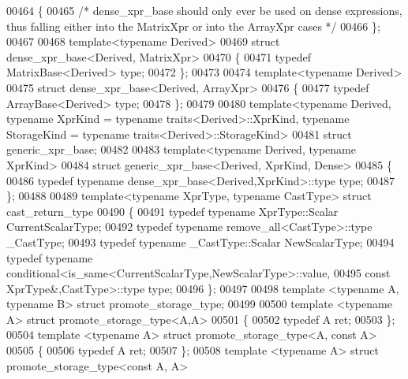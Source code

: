\begin{DoxyCode}
{00464 \{
00465   \textcolor{comment}{/* dense\_xpr\_base should only ever be used on dense expressions, thus falling either into the MatrixXpr
       or into the ArrayXpr cases */}
00466 \};
00467 
00468 \textcolor{keyword}{template}<\textcolor{keyword}{typename} Derived>
00469 \textcolor{keyword}{struct }dense\_xpr\_base<Derived, MatrixXpr>
00470 \{
00471   \textcolor{keyword}{typedef} MatrixBase<Derived> type;
00472 \};
00473 
00474 \textcolor{keyword}{template}<\textcolor{keyword}{typename} Derived>
00475 \textcolor{keyword}{struct }dense\_xpr\_base<Derived, ArrayXpr>
00476 \{
00477   \textcolor{keyword}{typedef} ArrayBase<Derived> type;
00478 \};
00479 
00480 template<typename Derived, typename XprKind = typename traits<Derived>::XprKind, \textcolor{keyword}{typename} StorageKind = \textcolor{keyword}{
      typename} traits<Derived>::StorageKind>
00481 \textcolor{keyword}{struct }generic\_xpr\_base;
00482 
00483 \textcolor{keyword}{template}<\textcolor{keyword}{typename} Derived, \textcolor{keyword}{typename} XprKind>
00484 \textcolor{keyword}{struct }generic\_xpr\_base<Derived, XprKind, Dense>
00485 \{
00486   \textcolor{keyword}{typedef} \textcolor{keyword}{typename} dense\_xpr\_base<Derived,XprKind>::type type;
00487 \};
00488 
00489 \textcolor{keyword}{template}<\textcolor{keyword}{typename} XprType, \textcolor{keyword}{typename} CastType> \textcolor{keyword}{struct }cast\_return\_type
00490 \{
00491   \textcolor{keyword}{typedef} \textcolor{keyword}{typename} XprType::Scalar CurrentScalarType;
00492   \textcolor{keyword}{typedef} \textcolor{keyword}{typename} remove\_all<CastType>::type \_CastType;
00493   \textcolor{keyword}{typedef} \textcolor{keyword}{typename} \_CastType::Scalar NewScalarType;
00494   \textcolor{keyword}{typedef} \textcolor{keyword}{typename} conditional<is\_same<CurrentScalarType,NewScalarType>::value,
00495                               \textcolor{keyword}{const} XprType&,CastType>::type type;
00496 \};
00497 
00498 \textcolor{keyword}{template} <\textcolor{keyword}{typename} A, \textcolor{keyword}{typename} B> \textcolor{keyword}{struct }promote\_storage\_type;
00499 
00500 \textcolor{keyword}{template} <\textcolor{keyword}{typename} A> \textcolor{keyword}{struct }promote\_storage\_type<A,A>
00501 \{
00502   \textcolor{keyword}{typedef} A ret;
00503 \};
00504 \textcolor{keyword}{template} <\textcolor{keyword}{typename} A> \textcolor{keyword}{struct }promote\_storage\_type<A, const A>
00505 \{
00506   \textcolor{keyword}{typedef} A ret;
00507 \};
00508 \textcolor{keyword}{template} <\textcolor{keyword}{typename} A> \textcolor{keyword}{struct }promote\_storage\_type<const A, A>
}
\end{DoxyCode}

